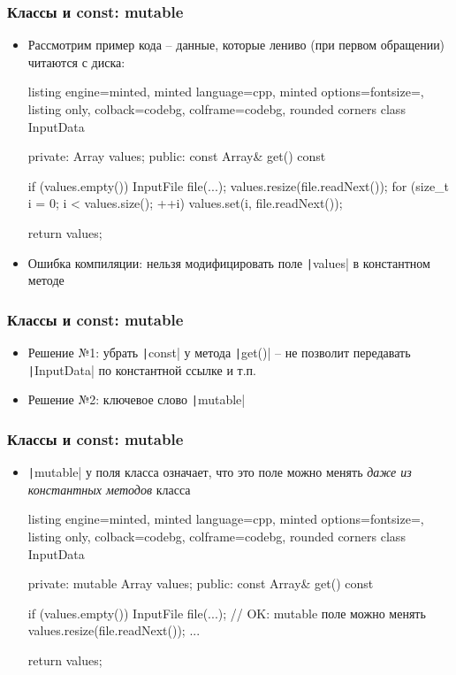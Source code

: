 \documentclass[10pt]{beamer}
\begin{document}
\begin{frame}[fragile]
\frametitle{Классы и const: mutable}
\begin{itemize}
\item Рассмотрим пример кода -- данные, которые лениво (при первом обращении) читаются с диска:
\begin{tcblisting}{listing engine=minted, minted language=cpp, minted options={fontsize=\scriptsize}, listing only, colback=codebg, colframe=codebg, rounded corners}
class InputData {
private:
  Array values;
public:
  const Array& get() const {
    if (values.empty()) {
      InputFile file(...);
      values.resize(file.readNext());
      for (size_t i = 0; i < values.size(); ++i)
        values.set(i, file.readNext());
    }

    return values;
  }
}
\end{tcblisting}
\pause
{}
\item Ошибка компиляции: нельзя модифицировать поле \texttt|values| в константном методе
\end{itemize}
\end{frame}

\begin{frame}[fragile]
\frametitle{Классы и const: mutable}
\begin{itemize}
\item Решение №1: убрать \texttt|const| у метода \texttt|get()| \pause -- не позволит передавать \texttt|InputData| по константной ссылке и т.п.
\pause
\item Решение №2: ключевое слово \texttt|mutable|
\end{itemize}
\end{frame}

\begin{frame}[fragile]
\frametitle{Классы и const: mutable}
\begin{itemize}
\item \texttt|mutable| у поля класса означает, что это поле можно менять \textit{даже из константных методов} класса
\pause
{}
\begin{tcblisting}{listing engine=minted, minted language=cpp, minted options={fontsize=\scriptsize}, listing only, colback=codebg, colframe=codebg, rounded corners}
class InputData {
private:
  mutable Array values;
public:
  const Array& get() const {
    if (values.empty()) {
      InputFile file(...);
      // OK: mutable поле можно менять
      values.resize(file.readNext());
      ...
    }

    return values;
  }
}
\end{tcblisting}
\end{itemize}
\end{frame}
\end{document}

